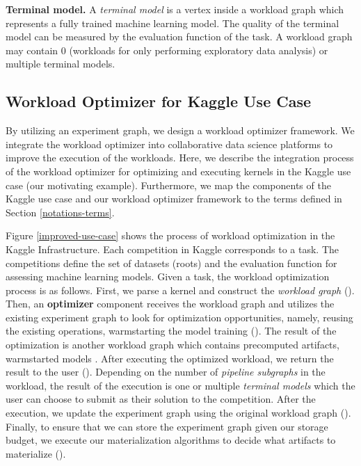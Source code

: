 \textbf{Terminal model.} A \textit{terminal model} is a vertex inside a workload graph which represents a fully trained machine learning model.
The quality of the terminal model can be measured by the evaluation function of the task.
A workload graph may contain $0$ (workloads for only performing exploratory data analysis) or multiple terminal models.


\subsection{Workload Optimizer for Kaggle Use Case}
By utilizing an experiment graph, we design a workload optimizer framework.
We integrate the workload optimizer into collaborative data science platforms to improve the execution of the workloads.
Here, we describe the integration process of the workload optimizer for optimizing and executing kernels in the Kaggle use case (our motivating example).
Furthermore, we map the components of the Kaggle use case and our workload optimizer framework to the terms defined in Section \ref{notations-terms}.

Figure \ref{improved-use-case} shows the process of workload optimization in the Kaggle Infrastructure.
Each competition in Kaggle corresponds to a task.
The competitions define the set of datasets (roots) and the evaluation function for assessing machine learning models. 
Given a task, the workload optimization process is as follows.
First, we parse a kernel and construct the \textit{workload graph} ().
Then, an \textbf{optimizer} component receives the workload graph and utilizes the existing experiment graph to look for optimization opportunities, namely, reusing the existing operations, warmstarting the model training  ().
The result of the optimization is another workload graph which contains precomputed artifacts, warmstarted models .
After executing the optimized workload, we return the result to the user ().
Depending on the number of \textit{pipeline subgraphs} in the workload, the result of the execution is one or multiple \textit{terminal models} which the user can choose to submit as their solution to the competition.
After the execution, we update the experiment graph using the original workload graph ().
Finally, to ensure that we can store the experiment graph given our storage budget, we execute our materialization algorithms to decide what artifacts to materialize ().

